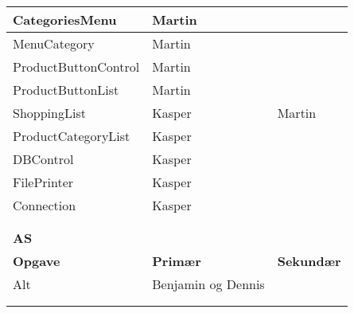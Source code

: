 \begin{table}[h]
\begin{tabular}{lll}
 \multicolumn{1}{|l|}{CategoriesMenu}         & \multicolumn{1}{l|}{Martin}                                  & \multicolumn{1}{l|}{}                  \\ \hline
 
 \multicolumn{1}{|l|}{MenuCategory}         & \multicolumn{1}{l|}{Martin}                                  & \multicolumn{1}{l|}{}                  \\ \hline
 
 \multicolumn{1}{|l|}{ProductButtonControl}         & \multicolumn{1}{l|}{Martin}                                  & \multicolumn{1}{l|}{}                  \\ \hline
 
 \multicolumn{1}{|l|}{ProductButtonList}         & \multicolumn{1}{l|}{Martin}                                  & \multicolumn{1}{l|}{}                  \\ \hline
 
 \multicolumn{1}{|l|}{ShoppingList}         & \multicolumn{1}{l|}{Kasper}                                  & \multicolumn{1}{l|}{Martin}                  \\ \hline
 
 \multicolumn{1}{|l|}{ProductCategoryList}         & \multicolumn{1}{l|}{Kasper}                                  & \multicolumn{1}{l|}{}                  \\ \hline
 
 \multicolumn{1}{|l|}{DBControl}         & \multicolumn{1}{l|}{Kasper}                                  & \multicolumn{1}{l|}{}                  \\ \hline
 
 \multicolumn{1}{|l|}{FilePrinter}         & \multicolumn{1}{l|}{Kasper}                                  & \multicolumn{1}{l|}{}                  \\ \hline
 
 \multicolumn{1}{|l|}{Connection}         & \multicolumn{1}{l|}{Kasper}                                  & \multicolumn{1}{l|}{}                  \\ \hline
 
& & \\& & \\ \hline                                           


\multicolumn{3}{|l|}{\color{lblue} \textbf{\gls{AS}}}                                                                                                               \\ \hline
\multicolumn{1}{|l|}{\textbf{Opgave}}           & \multicolumn{1}{l|}{\textbf{Primær}}                       & \multicolumn{1}{l|}{\textbf{Sekundær}} \\ \hline
\multicolumn{1}{|l|}{Alt}         & \multicolumn{1}{l|}{Benjamin og Dennis}                                  & \multicolumn{1}{l|}{}                  \\ \hline
& & \\& & \\ \hline 



\end{tabular}
\end{table}
